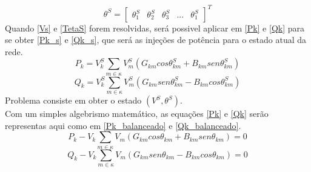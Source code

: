 \begin{equation}
    \theta^S  = \left[ \begin{matrix} \theta_1^S & \theta_2^S & \theta_3^S &... & \theta_1^S  \end{matrix} \right]^T 
    \label{TetaS}
\end{equation}
Quando \ref{Vs} e \ref{TetaS} forem resolvidas, será possivel aplicar em \ref{Pk} e \ref{Qk} para se obter \ref{Pk_s} e \ref{Qk_s}, que será as injeções de potência para o estado atual da rede.
\begin{equation}
    P_k = V_k^S \sum_{m\in \kappa} V_m^S (G_{km} cos\theta_{km}^S + B_{km}sen\theta_{km}^S)
    \label{Pk_s}
\end{equation}
\begin{equation}
    Q_k = V_k^S \sum_{m\in \kappa} V_m^S (G_{km} sen\theta_{km}^S - B_{km}cos\theta_{km}^S)
    \label{Qk_s}
\end{equation}
Problema consiste em obter o estado $(V^S,\theta^S)$.\\
Com um simples algebrismo matemático, as equações \ref{Pk} e \ref{Qk} serão representas aqui como em \ref{Pk_balanceado} e \ref{Qk_balanceado}.
\begin{equation}
    P_k - V_k \sum_{m\in \kappa} V_m (G_{km} cos\theta_{km} + B_{km}sen\theta_{km}) = 0
    \label{Pk_balanceado}
\end{equation}
\begin{equation}
    Q_k - V_k \sum_{m\in \kappa} V_m (G_{km} sen\theta_{km} - B_{km}cos\theta_{km}) = 0
    \label{Qk_balanceado}
\end{equation}






